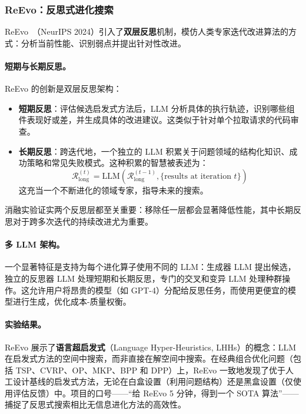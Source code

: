 \subsubsection{ReEvo：反思式进化搜索}

ReEvo~\citep{ye2024reevo}（NeurIPS 2024）引入了\textbf{双层反思}机制，模仿人类专家迭代改进算法的方式：分析当前性能、识别弱点并提出针对性改进。

\paragraph{短期与长期反思。}
ReEvo 的创新是双层反思架构：
\begin{itemize}
    \item \textbf{短期反思}：评估候选启发式方法后，LLM 分析具体的执行轨迹，识别哪些组件表现好或差，并生成具体的改进建议。这类似于针对单个拉取请求的代码审查。
    \item \textbf{长期反思}：跨迭代地，一个独立的 LLM 积累关于问题领域的结构化知识、成功策略和常见失败模式。这种积累的智慧被表述为：
\begin{equation}
\mathcal{R}_{\text{long}}^{(t)} = \text{LLM}\left(\mathcal{R}_{\text{long}}^{(t-1)}, \{\text{results at iteration } t\}\right)
\end{equation}
这充当一个不断进化的领域专家，指导未来的搜索。
\end{itemize}
消融实验证实两个反思层都至关重要：移除任一层都会显著降低性能，其中长期反思对于跨多次迭代的持续改进尤为重要。

\paragraph{多 LLM 架构。}
一个显著特征是支持为每个进化算子使用不同的 LLM：生成器 LLM 提出候选，独立的反思器 LLM 处理短期和长期反思，专门的交叉和变异 LLM 处理种群操作。这允许用户将昂贵的模型（如 GPT-4）分配给反思任务，而使用更便宜的模型进行生成，优化成本-质量权衡。

\paragraph{实验结果。}
ReEvo 展示了\textbf{语言超启发式}（Language Hyper-Heuristics, LHHs）的概念：LLM 在启发式方法的空间中搜索，而非直接在解空间中搜索。在经典组合优化问题（包括 TSP、CVRP、OP、MKP、BPP 和 DPP）上，ReEvo 一致地发现了优于人工设计基线的启发式方法，无论在白盒设置（利用问题结构）还是黑盒设置（仅使用评估反馈）中。项目的口号——``给 ReEvo 5 分钟，得到一个 SOTA 算法''——捕捉了反思式搜索相比无信息进化方法的高效性。

